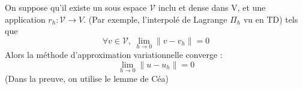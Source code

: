 On suppose qu'il existe un sous espace $\mathcal{V}$ inclu et dense dans V, et une application $r_h:\mathcal{V}\to V$. (Par exemple, l'interpolé de Lagrange $\Pi_h$ vu en TD) tels que 
	\[\forall v\in \mathcal{V},\ \lim_{h\to 0} \|v-v_h\|=0\]
Alors la méthode d'approximation variationnelle converge :
	\[\lim_{h\to 0} \|u-u_h\| =0\]
(Dans la preuve, on utilise le lemme de Céa)
